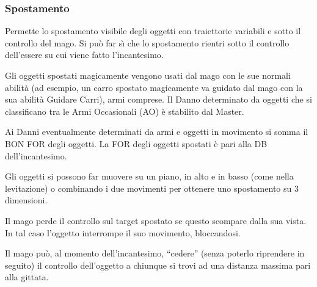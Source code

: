 

\fi

\subsubsection{Spostamento}
  Permette lo spostamento visibile degli oggetti con traiettorie variabili e
sotto il controllo del mago. Si pu\`o far s\`{\i} che lo
spostamento rientri sotto il controllo dell'essere su cui viene fatto
l'incantesimo. 

Gli oggetti spostati magicamente vengono usati dal mago
con le sue normali abilit\`a (ad esempio, un carro spostato
magicamente va guidato dal mago con la sua abilit\`a Guidare Carri),
armi comprese. Il Danno determinato da oggetti che si classificano tra
le Armi Occasionali (AO) \`e stabilito dal Master. 

Ai Danni
eventualmente determinati da armi e oggetti in movimento si somma il
BON FOR degli oggetti.  La FOR degli oggetti spostati \`e pari alla
DB dell'incantesimo. 

Gli oggetti si possono far muovere su un piano,
in alto e in basso (come nella levitazione) o combinando i due
movimenti per ottenere uno spostamento su 3 dimensioni. 

Il mago perde
il controllo sul target spostato se questo scompare dalla sua vista.
In tal caso l'oggetto interrompe il suo movimento, bloccandosi. 

Il
mago pu\`o, al momento dell'incantesimo, ``cedere'' (senza poterlo
riprendere in seguito) il controllo dell'oggetto a chiunque si trovi
ad una distanza massima pari alla gittata. 




